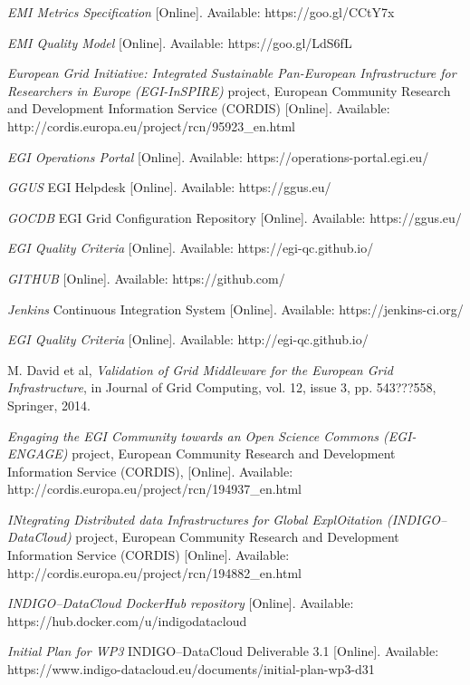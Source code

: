 \documentclass[journal]{IEEEtran}
\begin{document}
\begin{thebibliography}{1}
\emph{EMI Metrics Specification} [Online]. Available: https://goo.gl/CCtY7x

\emph{EMI Quality Model} [Online]. Available: https://goo.gl/LdS6fL

\emph{European Grid Initiative: Integrated Sustainable Pan-European
Infrastructure for Researchers in Europe (EGI-InSPIRE)} project, European
Community Research and Development Information Service (CORDIS) [Online]. Available:
http://cordis.europa.eu/project/rcn/95923\_en.html

\emph{EGI Operations Portal} [Online]. Available:
https://operations-portal.egi.eu/

\emph{GGUS} EGI Helpdesk [Online]. Available:
https://ggus.eu/

\emph{GOCDB} EGI Grid Configuration Repository [Online]. Available:
https://ggus.eu/

\emph{EGI Quality Criteria} [Online]. Available:
https://egi-qc.github.io/

\emph{GITHUB} [Online]. Available:
https://github.com/

\emph{Jenkins} Continuous Integration System [Online]. Available:
https://jenkins-ci.org/

\emph{EGI Quality Criteria} [Online]. Available: http://egi-qc.github.io/

M. David et al, \emph{Validation of Grid Middleware for the European Grid
Infrastructure}, in Journal of Grid Computing, vol. 12, issue 3, pp. 543???558,
Springer, 2014.

\emph{Engaging the EGI Community towards an Open Science Commons (EGI-ENGAGE)}
project, European Community Research and Development Information Service
(CORDIS), [Online]. Available:  http://cordis.europa.eu/project/rcn/194937\_en.html

\emph{INtegrating Distributed data Infrastructures for Global ExplOitation
(INDIGO--DataCloud)} project, European Community Research and Development
Information Service (CORDIS) [Online]. Available:
http://cordis.europa.eu/project/rcn/194882\_en.html

\emph{INDIGO--DataCloud DockerHub repository} [Online]. Available:
https://hub.docker.com/u/indigodatacloud

\emph{Initial Plan for WP3} INDIGO--DataCloud Deliverable 3.1 [Online]. Available:
https://www.indigo-datacloud.eu/documents/initial-plan-wp3-d31


\end{thebibliography}
\end{document}
